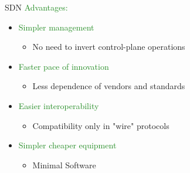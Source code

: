 \documentclass[a4paper, fontsize=8pt, landscape, DIV=1]{scrartcl}
\begin{document}
\begin{multicols*}{4}
		SDN \textcolor{ForestGreen}{Advantages:}
		\begin{itemize}[noitemsep]
			\item \textcolor{ForestGreen}{Simpler management}
			\begin{itemize}
				\item No need to invert control-plane operations
			\end{itemize}
			\item \textcolor{ForestGreen}{Faster pace of innovation}
			\begin{itemize}
				\item Less dependence of vendors and standards
			\end{itemize}
			\item \textcolor{ForestGreen}{Easier interoperability}
			\begin{itemize}
				\item Compatibility only in "wire" protocols
			\end{itemize}
			\item \textcolor{ForestGreen}{Simpler cheaper equipment}
			\begin{itemize}
				\item Minimal Software
			\end{itemize}
		\end{itemize}
		

\end{multicols*}
\end{document}
